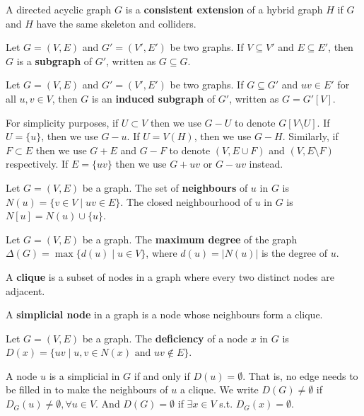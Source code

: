 \begin{definition}
\label{def:consistent_ext}
A directed acyclic graph $G$ is a \textbf{consistent extension} of a hybrid graph $H$ if $G$ and $H$ have the same skeleton and colliders. 
\end{definition}

\begin{definition}
\label{def:subgraph}
Let $G=(V,E)$ and $G'=(V',E')$ be two graphs. If $V \subseteq V'$ and $E \subseteq E'$, then $G$ is a \textbf{subgraph} of $G'$, written as $G \subseteq G$. 
\end{definition}

\begin{definition}
\label{def:induced_subgraph}
Let $G=(V,E)$ and $G'=(V',E')$ be two graphs. If $G\subseteq G'$ and $uv \in E'$ for all $u,v \in V$, then $G$ is an \textbf{induced subgraph} of $G'$, written as $G=G'[V]$.
\end{definition}
For simplicity purposes, if $U\subset V$ then we use $G-U$ to denote $G[V\setminus U]$. If $U=\{u\}$, then we use $G-u$. If $U=V(H)$, then we use $G-H$. Similarly, if $F\subset E$ then we use $G+E$ and $G-F$ to denote $(V,E\cup F)$  and $(V,E\setminus F)$ respectively. If $E = \{uv\}$ then we use $G+uv$ or $G-uv$ instead.

\begin{definition}
Let $G=(V,E)$ be a graph. The set of \textbf{neighbours} of $u$ in $G$ is $N(u)=\{v \in V \mid uv \in E\}$. The closed neighbourhood of $u$ in $G$ is $N[u]=N(u)\cup \{u\}$.
\end{definition}

\begin{definition}
Let $G=(V,E)$ be a graph. The \textbf{maximum degree} of the graph $\Delta(G)=\max\{d(u) \mid u \in V\}$, where $d(u)=|N(u)|$ is the degree of $u$.
\end{definition}

\begin{definition}
A \textbf{clique} is a subset of nodes in a graph where every two distinct nodes are adjacent. 
\end{definition}

\begin{definition}
A \textbf{simplicial node} in a graph is a node whose neighbours form a clique. 
\end{definition}

\begin{definition}
Let $G=(V,E)$ be a graph. The \textbf{deficiency} of a node $x$ in $G$ is $D(x)=\{uv \mid u, v \in N(x) \text{ and } uv \notin E\}$.
\end{definition}
A node $u$ is a simplicial in $G$ if and only if $D(u)=\emptyset$. That is, no edge needs to be filled in to make the neighbours of $u$ a clique. We write $D(G)\neq \emptyset$ if $D_G(u)\neq \emptyset, \forall u \in V$. And $D(G)=\emptyset$ if $\exists x \in V$ s.t. $D_G(x)=\emptyset$.

